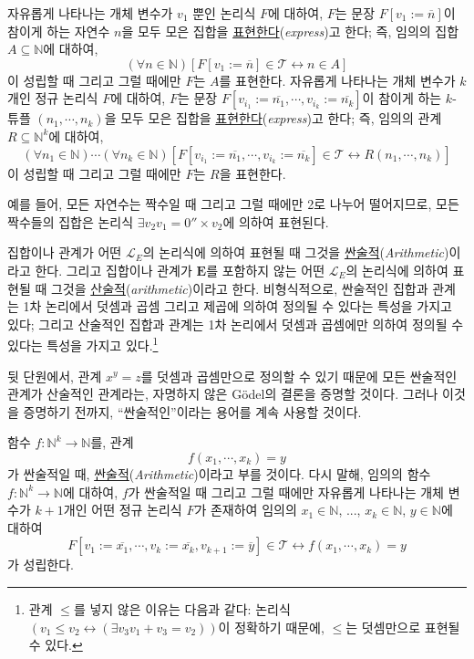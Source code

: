\documentclass[12pt]{paper}
\begin{document}
  자유롭게 나타나는 개체 변수가 $v_{1}$ 뿐인 논리식 $F$에 대하여,
  $F$는 문장 $F \left[ v_{1} := \overline{n} \right]$이 참이게 하는 자연수 $n$을 모두 모은 집합을 \underline{표현한다}(\textit{express})고 한다;
  즉, 임의의 집합 $A \subseteq \mathbb{N}$에 대하여, $$ \left( \forall n \in \mathbb{N} \right) \left[ F \left[ v_{1} := \overline{n} \right] \in \mathcal{T} \leftrightarrow n \in A \right] $$이 성립할 때 그리고 그럴 때에만 $F$는 $A$를 표현한다.
  자유롭게 나타나는 개체 변수가 $k$개인 정규 논리식 $F$에 대하여,
  $F$는 문장 $F \left[ v_{i_{1}} := \overline{n_{1}} , \cdots , v_{i_{k}} := \overline{n_{k}} \right]$이 참이게 하는 $k$-튜플 $\left( n_{1} , \cdots , n_{k} \right)$을 모두 모은 집합을 \underline{표현한다}(\textit{express})고 한다;
  즉, 임의의 관계 $R \subseteq \mathbb{N}^{k}$에 대하여, $$ \left( \forall n_{1} \in \mathbb{N} \right) \cdots \left( \forall n_{k} \in \mathbb{N} \right) \left[ F \left[ v_{i_{1}} := \overline{n_{1}} , \cdots , v_{i_{k}} := \overline{n_{k}} \right] \in \mathcal{T} \leftrightarrow R \left( n_{1} , \cdots , n_{k} \right) \right] $$이 성립할 때 그리고 그럴 때에만 $F$는 $R$을 표현한다.

  예를 들어, 모든 자연수는 짝수일 때 그리고 그럴 때에만 2로 나누어 떨어지므로, 모든 짝수들의 집합은 논리식 $\exists v_{2} v_{1} = 0'' \times v_{2}$에 의하여 표현된다.

  집합이나 관계가 어떤 $\mathcal{L}_{E}$의 논리식에 의하여 표현될 때 그것을 \underline{싼술적}(\textit{Arithmetic})이라고 한다.
  그리고 집합이나 관계가 $\mathbf{E}$를 포함하지 않는 어떤 $\mathcal{L}_{E}$의 논리식에 의하여 표현될 때 그것을 \underline{산술적}(\textit{arithmetic})이라고 한다.
  비형식적으로, 싼술적인 집합과 관계는 1차 논리에서 덧셈과 곱셈 그리고 제곱에 의하여 정의될 수 있다는 특성을 가지고 있다;
  그리고 산술적인 집합과 관계는 1차 논리에서 덧셈과 곱셈에만 의하여 정의될 수 있다는 특성을 가지고 있다.\footnote
  {
    관계 $\leq$를 넣지 않은 이유는 다음과 같다:
    논리식 $\left( v_{1} \leq v_{2} \leftrightarrow \left( \exists v_{3} v_{1} + v_{3} = v_{2} \right) \right)$이 정확하기 때문에,
    $\leq$는 덧셈만으로 표현될 수 있다.
  }

  뒷 단원에서, 관계 $x^{y} = z$를 덧셈과 곱셈만으로 정의할 수 있기 때문에 모든 싼술적인 관계가 산술적인 관계라는,
  자명하지 않은 G\"odel의 결론을 증명할 것이다.
  그러나 이것을 증명하기 전까지, ``싼술적인''이라는 용어를 계속 사용할 것이다.

  함수 $f : \mathbb{N}^{k} \to \mathbb{N}$를, 관계 $$f \left( x_{1} , \cdots , x_{k} \right) = y$$가 싼술적일 때, \underline{싼술적}(\textit{Arithmetic})이라고 부를 것이다.
  다시 말해, 임의의 함수 $f : \mathbb{N}^{k} \to \mathbb{N}$에 대하여, $f$가 싼술적일 때 그리고 그럴 때에만 자유롭게 나타나는 개체 변수가 $k + 1$개인 어떤 정규 논리식 $F$가 존재하여
  임의의 $x_{1} \in \mathbb{N}$, ..., $x_{k} \in \mathbb{N}$, $y \in \mathbb{N}$에 대하여 $$ F \left[ v_{1} := \overline{x_1} , \cdots , v_{k} := \overline{x_k} , v_{k + 1} := \overline{y} \right] \in \mathcal{T} \leftrightarrow f \left( x_{1} , \cdots , x_{k} \right) = y $$가 성립한다.
\end{document}
